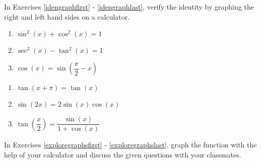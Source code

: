 In Exercises \ref{idengraphfirst} - \ref{idengraphlast}, verify the identity by graphing the right and left hand sides on a calculator.

\begin{multicols}{3}

\begin{enumerate}

\setcounter{enumi}{\value{HW}}

\item $\sin^{2}(x) + \cos^{2}(x) = 1$  \label{idengraphfirst} 
\item $\sec^{2}(x) - \tan^{2}(x) = 1$ 
\item  $\cos(x) = \sin\left(\dfrac{\pi}{2} - x\right)$

\setcounter{HW}{\value{enumi}}

\end{enumerate}

\end{multicols}

\begin{multicols}{3}

\begin{enumerate}

\setcounter{enumi}{\value{HW}}

\item  $\tan(x+\pi) = \tan(x)$ 
\item  $\sin(2x) = 2\sin(x)\cos(x)$ 
\item  $\tan\left(\dfrac{x}{2}\right) = \dfrac{\sin(x)}{1+\cos(x)}$ \label{idengraphlast}

\setcounter{HW}{\value{enumi}}

\end{enumerate}

\end{multicols}

In Exercises \ref{exploregraphsfirst} - \ref{exploregraphslast}, graph the function with the help of your calculator and discuss the given questions with your classmates.

